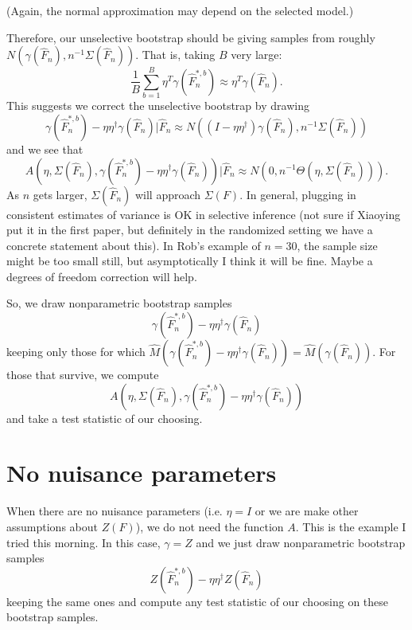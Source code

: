 \documentclass{article}
\begin{document}
(Again, the normal approximation may depend on the selected model.)

Therefore, our unselective bootstrap should be giving samples from
roughly $ N(\gamma(\hat{F}_n), n^{-1} \Sigma(\hat{F}_n))$. That is,
taking $B$ very large:
$$
\frac{1}{B}\sum_{b=1}^B \eta^T \gamma(\hat{F}^{*,b}_n) \approx \eta^T\gamma(\hat{F}_n).
$$
This suggests we correct the unselective bootstrap by drawing
$$
\gamma(\hat{F}^{*,b}_n) - \eta \eta^{\dagger}\gamma(\hat{F}_n) | \hat{F}_n \approx N((I - \eta\eta^{\dagger})\gamma(\hat{F}_n) ,n^{-1} \Sigma(\hat{F}_n))
$$
and we see that
$$
A(\eta, \Sigma(\hat{F}_n), \gamma(\hat{F}^{*,b}_n) - \eta \eta^{\dagger} \gamma(\hat{F}_n)) | \hat{F}_n
 \approx N(0 ,n^{-1} \Theta(\eta, \Sigma(\hat{F}_n))).
$$
As $n$ gets larger, $\Sigma(\hat{F}_n)$ will approach $\Sigma(F)$. In general,
plugging in consistent estimates of variance is OK in selective inference (not sure
if Xiaoying put it in the first paper, but definitely in the
randomized setting we have a concrete statement about this). In Rob's example of $n=30$, the sample size might be too small still, but asymptotically
I think it will be fine. Maybe a degrees of freedom correction will help.

So,
we draw nonparametric bootstrap samples
$$
\gamma(\hat{F}^{*,b}_n) - \eta \eta^{\dagger}\gamma(\hat{F}_n)
$$
keeping only those for which $\hat{M}(\gamma(\hat{F}^{*,b}_n) - \eta \eta^{\dagger}\gamma(\hat{F}_n)) = \hat{M}(\gamma(\hat{F}_n))$.
For those that survive, we compute
$$
A(\eta, \Sigma(\hat{F}_n), \gamma(\hat{F}^{*,b}_n) - \eta \eta^{\dagger}\gamma(\hat{F}_n))
$$
and take a test statistic of our choosing.

\section{No nuisance parameters}

When there are no nuisance parameters (i.e. $\eta=I$ or we are make other assumptions about $Z(F)$), we do not need the
function $A$. This is the example I tried this morning. In this
case, $\gamma=Z$ and we just draw nonparametric bootstrap samples
$$
Z(\hat{F}^{*,b}_n) - \eta \eta^{\dagger}Z(\hat{F}_n)
$$
keeping the same ones and compute any test statistic of our 
choosing on these bootstrap samples. 
\end{document}
